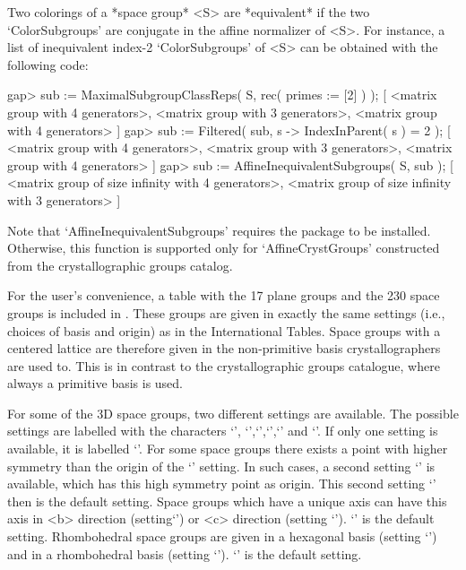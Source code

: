 Two colorings of a *space group* <S> are *equivalent* if the two
`ColorSubgroups' are conjugate in the affine normalizer of <S>.
For instance, a list of inequivalent index-2 `ColorSubgroups' of 
<S> can be obtained with the following code:

\beginexample
gap> sub := MaximalSubgroupClassReps( S, rec( primes := [2] ) );
[ <matrix group with 4 generators>, <matrix group with 3 generators>, 
  <matrix group with 4 generators> ]
gap> sub := Filtered( sub, s -> IndexInParent( s ) = 2 );
[ <matrix group with 4 generators>, <matrix group with 3 generators>, 
  <matrix group with 4 generators> ]
gap> sub := AffineInequivalentSubgroups( S, sub );
[ <matrix group of size infinity with 4 generators>, 
  <matrix group of size infinity with 3 generators> ]
\endexample

Note that `AffineInequivalentSubgroups' requires the {\GAP} package 
{\CARAT} to be installed. Otherwise, this function is supported only 
for `AffineCrystGroups' constructed from the crystallographic groups 
catalog.


For the user's convenience, a table with the 17 plane groups and the
230 space groups is included in {\Cryst}. These groups are given in 
exactly the same settings (i.e., choices of basis and origin) as in 
the International Tables. Space groups with a centered lattice are
therefore given in the non-primitive basis crystallographers are
used to. This is in contrast to the crystallographic groups catalogue,
where always a primitive basis is used.

For some of the 3D space groups, two different settings are available.
The possible settings are labelled with the characters `\pif',
`\pif',`\pif',`\pif',`\pif' and `\pif'.
If only one setting is available, it is labelled `\pif'. For
some space groups there exists a point with higher symmetry than the
origin of the `\pif' setting. In such cases, a second setting
`\pif' is available, which has this high symmetry point as
origin. This second setting `\pif' then is the default setting.
Space groups which have a unique axis can have this axis in <b>
direction (setting`\pif') or <c> direction (setting
`\pif'). `\pif' is the default setting. Rhombohedral 
space groups are given in a hexagonal basis (setting `\pif') and
in a rhombohedral basis (setting `\pif'). `\pif' is the 
default setting.

